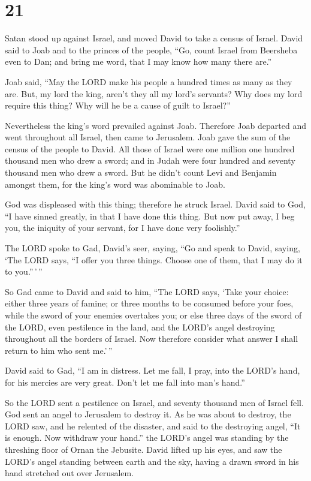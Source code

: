 \hypertarget{section-20}{%
\section{21}\label{section-20}}

 Satan stood up against Israel, and moved David to take a
census of Israel.  David said to Joab and to the princes of
the people, ``Go, count Israel from Beersheba even to Dan; and bring me
word, that I may know how many there are.''

 Joab said, ``May the LORD make his people a hundred times
as many as they are. But, my lord the king, aren't they all my lord's
servants? Why does my lord require this thing? Why will he be a cause of
guilt to Israel?''

 Nevertheless the king's word prevailed against Joab.
Therefore Joab departed and went throughout all Israel, then came to
Jerusalem.  Joab gave the sum of the census of the people to
David. All those of Israel were one million one hundred thousand men who
drew a sword; and in Judah were four hundred and seventy thousand men
who drew a sword.  But he didn't count Levi and Benjamin
amongst them, for the king's word was abominable to Joab.

 God was displeased with this thing; therefore he struck
Israel.  David said to God, ``I have sinned greatly, in that
I have done this thing. But now put away, I beg you, the iniquity of
your servant, for I have done very foolishly.''

 The LORD spoke to Gad, David's seer, saying, 
``Go and speak to David, saying, `The LORD says, ``I offer you three
things. Choose one of them, that I may do it to you.''\,'\,''

 So Gad came to David and said to him, ``The LORD says,
`Take your choice:  either three years of famine; or three
months to be consumed before your foes, while the sword of your enemies
overtakes you; or else three days of the sword of the LORD, even
pestilence in the land, and the LORD's angel destroying throughout all
the borders of Israel. Now therefore consider what answer I shall return
to him who sent me.'\,''

 David said to Gad, ``I am in distress. Let me fall, I
pray, into the LORD's hand, for his mercies are very great. Don't let me
fall into man's hand.''

 So the LORD sent a pestilence on Israel, and seventy
thousand men of Israel fell.  God sent an angel to
Jerusalem to destroy it. As he was about to destroy, the LORD saw, and
he relented of the disaster, and said to the destroying angel, ``It is
enough. Now withdraw your hand.'' the LORD's angel was standing by the
threshing floor of Ornan the Jebusite.  David lifted up his
eyes, and saw the LORD's angel standing between earth and the sky,
having a drawn sword in his hand stretched out over Jerusalem.

